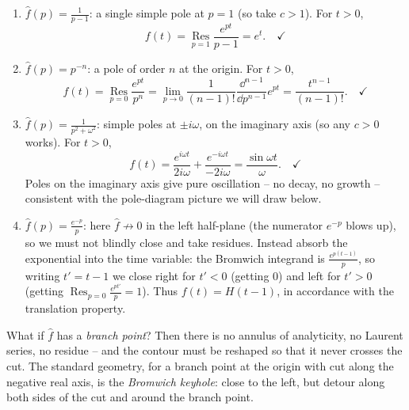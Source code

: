 \documentclass[a4paper]{scrartcl}
\newcommand{\Res}{\operatorname*{Res}}
\begin{document}
\begin{example}
	\begin{enumerate}[label=(\roman*)]
		\item $\hat f(p) = \frac{1}{p - 1}$: a single simple pole at $p = 1$ (so take $c > 1$). For $t > 0$,
		$$
		f(t) = \Res_{p = 1} \frac{e^{pt}}{p - 1} = e^t. \quad\checkmark
		$$
		\item $\hat f(p) = p^{-n}$: a pole of order $n$ at the origin. For $t > 0$,
		$$
		f(t) = \Res_{p = 0} \frac{e^{pt}}{p^n} = \lim_{p \to 0}\frac{1}{(n-1)!} \frac{\dd^{n-1}}{\dd p^{n-1}} e^{pt} = \frac{t^{n - 1}}{(n-1)!}. \quad\checkmark
		$$
		\item $\hat f(p) = \frac{1}{p^2 + \omega^2}$: simple poles at $\pm i\omega$, on the imaginary axis (so any $c > 0$ works). For $t > 0$,
		$$
		f(t) = \frac{e^{i\omega t}}{2i\omega} + \frac{e^{-i\omega t}}{-2i\omega} = \frac{\sin \omega t}{\omega}. \quad\checkmark
		$$
		Poles on the imaginary axis give pure oscillation -- no decay, no growth -- consistent with the pole-diagram picture we will draw below.
		\item $\hat f(p) = \frac{e^{-p}}{p}$: here $\hat f \not\to 0$ in the left half-plane (the numerator $e^{-p}$ blows up), so we must not blindly close and take residues. Instead absorb the exponential into the time variable: the Bromwich integrand is $\frac{e^{p(t - 1)}}{p}$, so writing $t' = t - 1$ we close right for $t' < 0$ (getting $0$) and left for $t' > 0$ (getting $\Res_{p=0} \frac{e^{pt'}}{p} = 1$). Thus $f(t) = H(t - 1)$, in accordance with the translation property.
	\end{enumerate}
\end{example}

What if $\hat f$ has a \emph{branch point}? Then there is no annulus of analyticity, no Laurent series, no residue -- and the contour must be reshaped so that it never crosses the cut. The standard geometry, for a branch point at the origin with cut along the negative real axis, is the \emph{Bromwich keyhole}: close to the left, but detour along both sides of the cut and around the branch point.

\begin{center}
\end{center}
\end{document}
